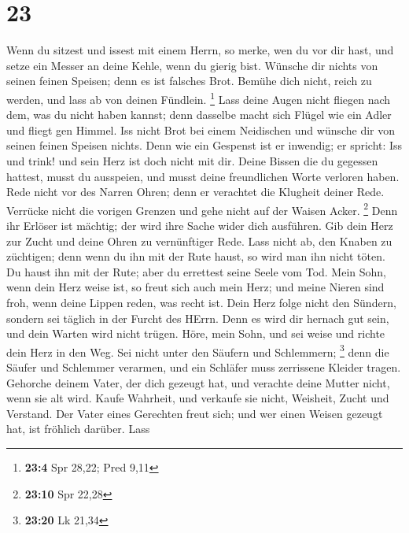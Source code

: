 \hypertarget{section-10}{%
\section{23}\label{section-10}}

 Wenn du sitzest und issest mit einem Herrn, so merke, wen
du vor dir hast,  und setze ein Messer an deine Kehle, wenn
du gierig bist.  Wünsche dir nichts von seinen feinen
Speisen; denn es ist falsches Brot.  Bemühe dich nicht,
reich zu werden, und lass ab von deinen Fündlein. \footnote{\textbf{23:4}
  Spr 28,22; Pred 9,11}  Lass deine Augen nicht fliegen nach
dem, was du nicht haben kannst; denn dasselbe macht sich Flügel wie ein
Adler und fliegt gen Himmel.  Iss nicht Brot bei einem
Neidischen und wünsche dir von seinen feinen Speisen nichts.
 Denn wie ein Gespenst ist er inwendig; er spricht: Iss und
trink! und sein Herz ist doch nicht mit dir.  Deine Bissen
die du gegessen hattest, musst du ausspeien, und musst deine
freundlichen Worte verloren haben.  Rede nicht vor des
Narren Ohren; denn er verachtet die Klugheit deiner Rede. 
Verrücke nicht die vorigen Grenzen und gehe nicht auf der Waisen Acker.
\footnote{\textbf{23:10} Spr 22,28}  Denn ihr Erlöser ist
mächtig; der wird ihre Sache wider dich ausführen.  Gib
dein Herz zur Zucht und deine Ohren zu vernünftiger Rede. 
Lass nicht ab, den Knaben zu züchtigen; denn wenn du ihn mit der Rute
haust, so wird man ihn nicht töten.  Du haust ihn mit der
Rute; aber du errettest seine Seele vom Tod.  Mein Sohn,
wenn dein Herz weise ist, so freut sich auch mein Herz; 
und meine Nieren sind froh, wenn deine Lippen reden, was recht ist.
 Dein Herz folge nicht den Sündern, sondern sei täglich in
der Furcht des HErrn.  Denn es wird dir hernach gut sein,
und dein Warten wird nicht trügen.  Höre, mein Sohn, und
sei weise und richte dein Herz in den Weg.  Sei nicht unter
den Säufern und Schlemmern; \footnote{\textbf{23:20} Lk 21,34}
 denn die Säufer und Schlemmer verarmen, und ein Schläfer
muss zerrissene Kleider tragen.  Gehorche deinem Vater, der
dich gezeugt hat, und verachte deine Mutter nicht, wenn sie alt wird.
 Kaufe Wahrheit, und verkaufe sie nicht, Weisheit, Zucht
und Verstand.  Der Vater eines Gerechten freut sich; und
wer einen Weisen gezeugt hat, ist fröhlich darüber.  Lass
